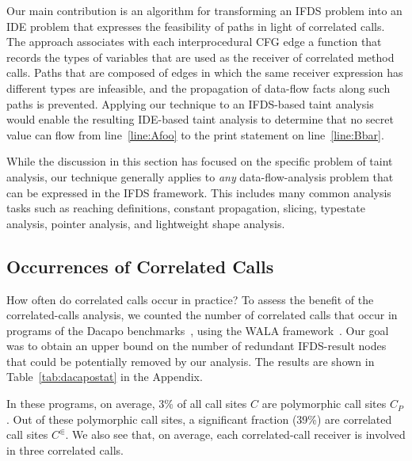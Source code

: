 Our main contribution is an algorithm for transforming an IFDS problem 
into an IDE problem that expresses the feasibility of paths
in light of correlated calls.
The approach associates with each interprocedural CFG edge 
a function that records the types of 
variables that are used as the receiver of correlated method calls. Paths that 
are composed of edges in which the same receiver expression has different types
are infeasible, and the propagation of data-flow facts along such paths is
prevented. Applying our technique to an IFDS-based taint analysis would enable
the resulting IDE-based taint analysis to determine that no secret value can flow from
line~\ref{line:Afoo} to the print statement on line~\ref{line:Bbar}. 

While the discussion in this section has focused on the specific problem of taint analysis,
our technique generally applies to \textit{any}
data-flow-analysis problem that can be expressed in the IFDS framework. This includes
many common analysis tasks such as reaching definitions, constant propagation, slicing,
typestate analysis, pointer analysis, and lightweight
shape analysis.

\subsection{Occurrences of Correlated Calls}\label{sec:occur}\vspace{-.5mm}
How often do correlated calls occur in practice? To assess the benefit of the correlated-calls analysis, we counted the number of correlated calls that occur in programs of the Dacapo benchmarks~\cite{blackburn2006dacapo}, using the WALA framework~\cite{fink2012wala}.
Our goal was to obtain an upper bound on the number of redundant IFDS-result nodes that could be potentially removed by our analysis. The results are shown in Table~\ref{tab:dacapostat} in the Appendix.

In these programs, on average, 3\% of all call sites $C$ are polymorphic call sites $C_P$.
Out of these polymorphic call sites, a significant fraction (39\%) are correlated 
call sites $C^\Subset$. We also see that, on average,  each correlated-call receiver is involved in three correlated calls. 

